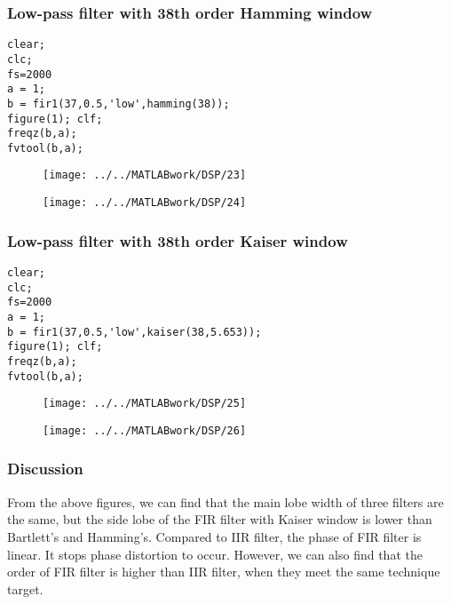 \documentclass[12pt,a4paper]{article}
\begin{document}
\subsubsection{Low-pass filter with 38th order Hamming window}
\begin{lstlisting}
clear;
clc;
fs=2000
a = 1;
b = fir1(37,0.5,'low',hamming(38));
figure(1); clf;
freqz(b,a);
fvtool(b,a);
\end{lstlisting}
\begin{figure}[htbp]
	\centering
	\begin{minipage}[h]{0.48\textwidth}
		\centering
		\texttt{[image: ../../MATLABwork/DSP/23]}
	\end{minipage}
	\begin{minipage}[htbp]{0.48\textwidth}
		\centering
		\texttt{[image: ../../MATLABwork/DSP/24]}
	\end{minipage}
\end{figure}

\subsubsection{Low-pass filter with 38th order Kaiser window}
\begin{lstlisting}
clear;
clc;
fs=2000
a = 1;
b = fir1(37,0.5,'low',kaiser(38,5.653));
figure(1); clf;
freqz(b,a);
fvtool(b,a);
\end{lstlisting}
\begin{figure}[htbp]
	\centering
	\begin{minipage}[h]{0.48\textwidth}
		\centering
		\texttt{[image: ../../MATLABwork/DSP/25]}
	\end{minipage}
	\begin{minipage}[htbp]{0.48\textwidth}
		\centering
		\texttt{[image: ../../MATLABwork/DSP/26]}
	\end{minipage}
\end{figure}

\subsubsection{Discussion}
From the above figures, we can find that the main lobe width of three filters are the same, but the side lobe of the FIR filter with Kaiser window is lower than Bartlett’s and Hamming’s. 
Compared to IIR filter, the phase of FIR filter is linear. It stops phase distortion to occur. However, we can also find that the order of FIR filter is higher than IIR filter, when they meet the same technique target. 



\end{document}

